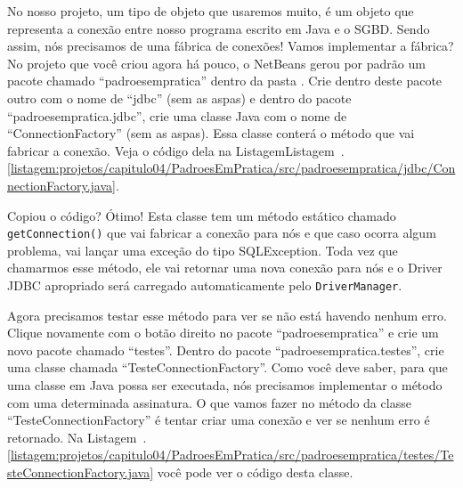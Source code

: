 No nosso projeto, um tipo de objeto que usaremos muito, é um objeto que representa a conexão entre nosso programa escrito em Java e o SGBD. Sendo assim, nós precisamos de uma fábrica de conexões! Vamos implementar a fábrica? No projeto que você criou agora há pouco, o NetBeans gerou por padrão um pacote chamado ``padroesempratica'' dentro da pasta . Crie dentro deste pacote outro com o nome de ``jdbc'' (sem as aspas) e dentro do pacote ``padroesempratica.jdbc'', crie uma classe Java com o nome de ``ConnectionFactory'' (sem as aspas). Essa classe conterá o método que vai fabricar a conexão. Veja o código dela na ListagemListagem~\thechapter.\ref{listagem:projetos/capitulo04/PadroesEmPratica/src/padroesempratica/jdbc/ConnectionFactory.java}.


Copiou o código? Ótimo! Esta classe tem um método estático chamado \texttt{getConnection()} que vai fabricar a conexão para nós e que caso ocorra algum problema, vai lançar uma exceção do tipo SQLException. Toda vez que chamarmos esse método, ele vai retornar uma nova conexão para nós e o Driver JDBC apropriado será carregado automaticamente pelo \texttt{DriverManager}. 

Agora precisamos testar esse método para ver se não está havendo nenhum erro. Clique novamente com o botão direito no pacote ``padroesempratica'' e crie um novo pacote chamado ``testes''. Dentro do pacote ``padroesempratica.testes'', crie uma classe chamada ``TesteConnectionFactory''. Como você deve saber, para que uma classe em Java possa ser executada, nós precisamos implementar o método  com uma determinada assinatura. O que vamos fazer no método  da classe ``TesteConnectionFactory'' é tentar criar uma conexão e ver se nenhum erro é retornado. Na Listagem~\thechapter.\ref{listagem:projetos/capitulo04/PadroesEmPratica/src/padroesempratica/testes/TesteConnectionFactory.java} você pode ver o código desta classe.



